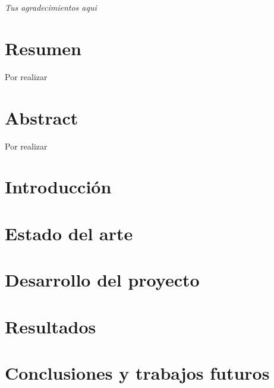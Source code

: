 \documentclass[a4paper]{report}
\newcommand\paginablanco{%
    \null
    \thispagestyle{empty}%
    \newpage}
\begin{document}

\chapter*{}
\thispagestyle{empty}
\begin{flushright}
\textit{Tus agradecimientos aqui}
\end{flushright}


\chapter*{Resumen} %
Por realizar

\chapter*{Abstract} %
Por realizar

\tableofcontents
\newpage
\listoftables %
\newpage
\listoffigures
\newpage

\paginablanco{}

\chapter{Introducción}

\chapter{Estado del arte}

\chapter{Desarrollo del proyecto}

\chapter{Resultados}

\chapter{Conclusiones y trabajos futuros}

\newpage


\appendix
\clearpage
\addappheadtotoc
\appendixpage

\end{document}
